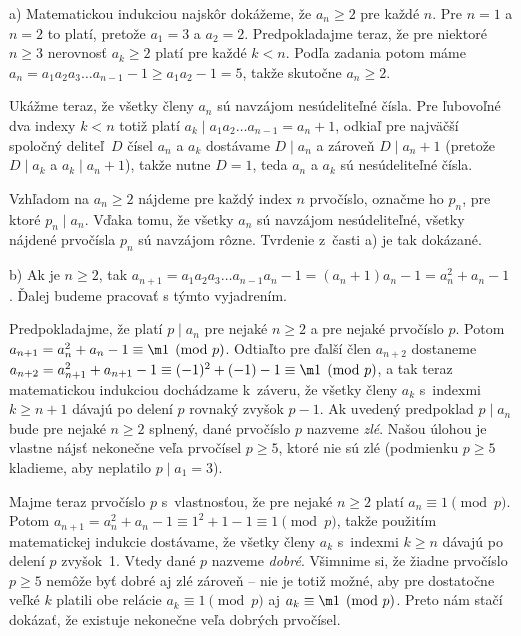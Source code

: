 {%
a)
Matematickou indukciou najskôr dokážeme, že
$a_n \geq 2$ pre
 každé $n$. Pre $n=1$ a $n=2$ to platí, pretože
$a_1 = 3$ a $a_2 = 2$. Predpokladajme teraz, že pre niektoré $n\geq 3$
nerovnosť $a_k \geq 2$ platí pre každé $k<n$. Podľa zadania potom
máme $a_n = a_1 a_2 a_3 \dots a_{n-1} - 1\geq a_1 a_2-1=5$,
takže skutočne $a_n \geq 2$.

Ukážme teraz, že všetky členy $a_n$ sú navzájom
nesúdeliteľné čísla. Pre ľubovoľné dva indexy $k < n$ totiž platí
$a_k \mid a_1 a_2 \dots a_{n-1} = a_n+1$, odkiaľ pre najväčší
spoločný deliteľ~$D$ čísel $a_n$ a $a_k$ dostávame $D \mid a_n$ a
zároveň $D \mid a_n+1$ (pretože $D \mid a_k$ a $a_k \mid a_n+1$),
takže nutne $D = 1$, teda $a_n$ a $a_k$ sú nesúdeliteľné čísla.

Vzhľadom na $a_n \geq 2$ nájdeme pre každý index $n$ prvočíslo,
označme ho $p_n$, pre ktoré $p_n \mid a_n$. Vďaka tomu,
že všetky $a_n$ sú navzájom nesúdeliteľné, všetky nájdené
prvočísla $p_n$ sú navzájom rôzne. Tvrdenie z~časti a) je tak dokázané.

\smallskip
b)
Ak je $n\geq 2$, tak $a_{n+1}=a_1 a_2 a_3 \dots a_{n-1}a_n - 1
=(a_n + 1)a_n - 1 = a_n^2 + a_n - 1$. Ďalej budeme pracovať s týmto
vyjadrením.

Predpokladajme, že platí $p \mid a_n$ pre nejaké $n\geq2$
a pre nejaké prvočíslo $p$. Potom
$a_{n+1} = a_n^2 + a_n - 1 \equiv \m1\pmod p$.
Odtiaľto pre ďalší člen $a_{n+2}$ dostaneme
$a_{n+2} = a_{n+1}^2 + a_{n+1} - 1 \equiv (-1)^2 + (-1) - 1
\equiv \m1 \pmod p$, a tak teraz matematickou indukciou dochádzame
k~záveru, že všetky členy $a_k$ s~indexmi $k\geq n+1$ dávajú po
delení $p$ rovnaký zvyšok ${p-1}$. Ak uvedený
predpoklad $p \mid a_n$ bude pre nejaké $n \geq 2$ splnený,
dané prvočíslo $p$ nazveme {\it zlé}. Našou úlohou je vlastne
nájsť nekonečne veľa prvočísel $p\geq5$, ktoré nie sú zlé
(podmienku $p \geq 5$ kladieme, aby neplatilo $p\mid a_1=3$).

Majme teraz prvočíslo $p$ s~vlastnosťou, že pre nejaké $n\geq2$
platí $a_n \equiv 1 \pmod p$. Potom $a_{n+1} = a_n^2 +
a_n - 1\equiv 1^2 + 1 - 1 \equiv 1 \pmod p$, takže použitím
matematickej indukcie dostávame, že všetky členy $a_k$ s~indexmi
$k\geq n$ dávajú po delení $p$ zvyšok~1. Vtedy dané $p$
nazveme {\it dobré}. Všimnime si, že žiadne prvočíslo $p\geq 5$
nemôže byť dobré aj zlé zároveň -- nie je totiž možné,
aby pre dostatočne veľké $k$ platili obe relácie
$a_k\equiv1\pmod p$ aj $a_k\equiv\m1\pmod p$. Preto nám stačí
dokázať, že existuje nekonečne veľa dobrých prvočísel.

}
